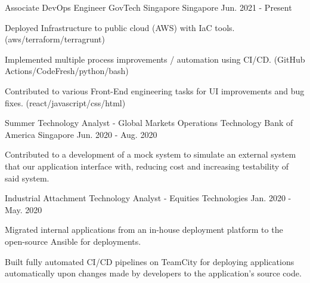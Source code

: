 

\begin{cventries}

  \cventry
    {Associate DevOps Engineer} %
    {GovTech Singapore} %
    {Singapore} %
    {Jun. 2021 - Present} %
    {
      \begin{cvitems} %
        \item {Deployed Infrastructure to public cloud (AWS) with IaC tools. (aws/terraform/terragrunt)}
        \item {Implemented multiple process improvements / automation using CI/CD. (GitHub Actions/CodeFresh/python/bash)}
        \item {Contributed to various Front-End engineering tasks for UI improvements and bug fixes. (react/javascript/css/html)}
      \end{cvitems}
    }

  \cventry
    {Summer Technology Analyst - Global Markets Operations Technology} %
    {Bank of America} %
    {Singapore} %
    {Jun. 2020 - Aug. 2020} %
    {
      \begin{cvitems} %
        \item {Contributed to a development of a mock system to simulate an external system that our application interface with, reducing cost and increasing testability of said system.}
      \end{cvitems}
    }

  \cventry
    {Industrial Attachment Technology Analyst - Equities Technologies} %
    {} %
    {} %
    {Jan. 2020 - May. 2020} %
    {
      \begin{cvitems} %
        \item {Migrated internal applications from an in-house deployment platform to the open-source Ansible for deployments.}
        \item {Built fully automated CI/CD pipelines on TeamCity for deploying applications automatically upon changes made by developers to the application's source code.}
      \end{cvitems}
    }




\end{cventries}
